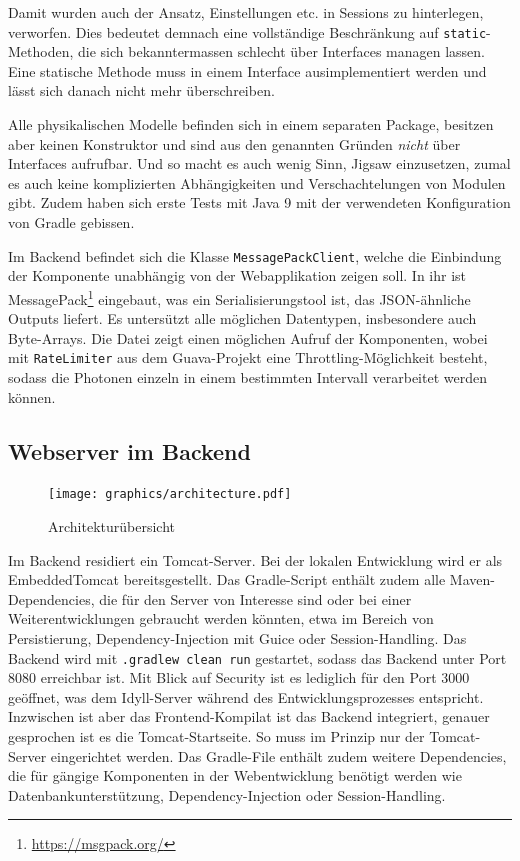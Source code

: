 \documentclass[a4paper,10.2pt,pdftex]{scrartcl}%
\begin{document}
Damit wurden auch der Ansatz, Einstellungen etc. in Sessions zu hinterlegen, verworfen. Dies bedeutet demnach eine vollständige Beschränkung auf \texttt{static}-Methoden, die sich bekanntermassen schlecht über Interfaces managen lassen. Eine statische Methode  muss in einem Interface ausimplementiert werden und lässt sich danach nicht mehr überschreiben. 

Alle physikalischen Modelle befinden sich in einem separaten Package, besitzen aber keinen Konstruktor und sind aus den genannten Gründen \emph{nicht} über Interfaces aufrufbar. Und so macht es auch wenig Sinn, Jigsaw einzusetzen, zumal es auch keine komplizierten Abhängigkeiten und Verschachtelungen von Modulen gibt. Zudem haben sich erste Tests mit Java 9 mit der verwendeten Konfiguration von Gradle gebissen.  

Im Backend befindet sich die Klasse \texttt{MessagePackClient}, welche die Einbindung der Komponente unabhängig von der Webapplikation zeigen soll. In ihr ist MessagePack\footnote{\url{https://msgpack.org/}} eingebaut, was ein Serialisierungstool ist, das JSON-ähnliche Outputs liefert. Es untersützt alle möglichen Datentypen, insbesondere auch Byte-Arrays. Die Datei zeigt einen möglichen Aufruf der Komponenten, wobei mit \texttt{RateLimiter} aus dem Guava-Projekt eine Throttling-Möglichkeit besteht, sodass die Photonen einzeln in einem bestimmten Intervall verarbeitet werden können. 

\subsection{Webserver im Backend}
\begin{figure}
\texttt{[image: graphics/architecture.pdf]}
\caption{Architekturübersicht}
\end{figure}

Im Backend residiert ein Tomcat-Server. Bei der lokalen Entwicklung wird er als EmbeddedTomcat bereitsgestellt. Das Gradle-Script enthält zudem alle Maven-Dependencies, die für den Server von Interesse sind oder bei einer Weiterentwicklungen gebraucht werden könnten, etwa im Bereich von Persistierung, Dependency-Injection mit Guice oder Session-Handling. Das Backend wird mit \texttt{.gradlew clean run} gestartet, sodass das Backend unter Port 8080 erreichbar ist. Mit Blick auf Security ist es lediglich für den Port 3000 geöffnet, was dem Idyll-Server während des Entwicklungsprozesses entspricht. Inzwischen ist aber das Frontend-Kompilat ist das Backend integriert, genauer gesprochen ist es die Tomcat-Startseite. So muss im Prinzip nur der Tomcat-Server eingerichtet werden. Das Gradle-File enthält zudem weitere Dependencies, die für gängige Komponenten in der Webentwicklung benötigt werden wie Datenbankunterstützung, Dependency-Injection oder Session-Handling.
\end{document}
